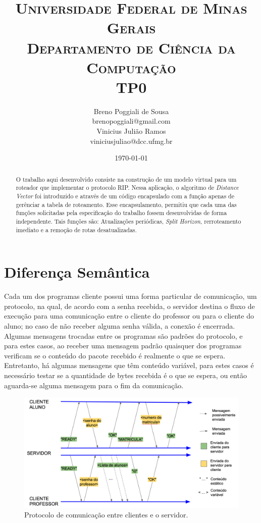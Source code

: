 \documentclass[10pt]{extarticle}
\title{ \textsc{Universidade Federal de Minas Gerais} \\ \textsc{Departamento de Ciência da Computação} \\ \bigskip TP0}
\author{Breno Poggiali de Sousa \\ \normalsize{brenopoggiali@gmail.com}\\
Vinicius Julião Ramos \\ \normalsize{viniciusjuliao@dcc.ufmg.br}}
\date{\today}
\begin{document}
\maketitle

\begin{abstract}
    O trabalho aqui desenvolvido consiste na construção de um modelo virtual
    para um roteador que implementar o protocolo RIP.
    Nessa aplicação, o algoritmo de \textit{Distance Vector} foi introduzido e
    através de um código encapsulado com a função apenas de gerênciar a tabela
    de roteamento.
    Esse encapsulamento, permitiu que cada uma das funções solicitadas pela
    especificação do trabalho fossem desenvolvidas de forma independente.
    Tais funções são: Atualizações periódicas, \textit{Split
    Horizon}, rerroteamento imediato e a remoção de rotas desatualizadas.
\end{abstract}





\section{Diferença Semântica}
Cada um dos programas cliente possui uma forma particular de comunicação, um protocolo, na qual, de acordo com a senha recebida, o servidor destina o fluxo de execução para uma comunicação entre o cliente do professor ou para o cliente do aluno; no caso de não receber alguma senha válida, a conexão é encerrada. Algumas mensagens trocadas entre os programas são padrões do protocolo, e para estes casos, ao receber uma mensagem padrão quaisquer dos programas verificam se o conteúdo do pacote recebido é realmente o que se espera. Entretanto, há algumas mensagens que têm conteúdo variável, para estes casos é necessário testar se a quantidade de bytes recebida é o que se espera, ou então aguarda-se alguma mensagem para o fim da comunicação.
\begin{figure}[h]
	\begin{center}
		\includegraphics[scale=0.35]{Figuras/diagrama.png}
	\end{center}
	\caption{\label{fig:digrama} Protocolo de comunicação entre clientes e o servidor.}
\end{figure}
\end{document}
